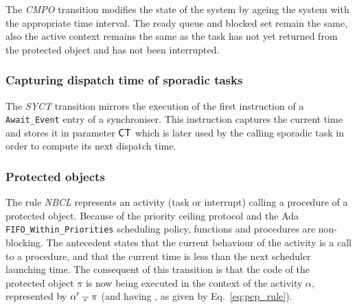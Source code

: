 The \emph{CMPO} transition modifies the state of the system by ageing
the system with the appropriate time interval. The ready queue and
blocked set remain the same, also the active context remains the same
as the task has not yet returned from the protected object and has not
been interrupted.

\subsubsection{Capturing dispatch time of sporadic tasks}
The \emph{SYCT} transition mirrors the execution of the first
instruction of a \texttt{Await\_Event} entry of a synchroniser. This
instruction captures the current time and stores it in parameter
$\text{\sffamily CT}$ which is later used by the calling sporadic task in order
to compute its next dispatch time.


\subsubsection{Protected objects}
The rule \emph{NBCL} represents an activity (task or interrupt)
calling a procedure of a protected object. Because of the priority
ceiling protocol and the Ada \texttt{FIFO\_Within\_Priorities}
scheduling policy, functions and procedures are non-blocking. The
antecedent states that the current behaviour of the activity is a call
to a procedure, and that the current time is less than the next
scheduler launching time. The consequent of this transition is that
the code of the protected object $\pi$ is now being executed in the
context of the activity $\alpha$, represented by $\alpha'\,\frac{}{\,^{{x}}\,}\,\pi$
(and having , as given by
Eq.~\ref{eq:pcp_rule}).


